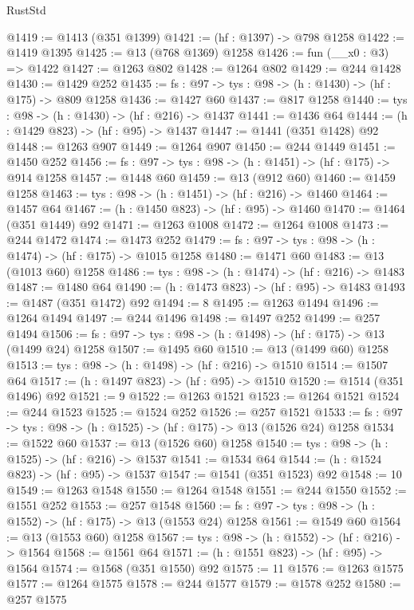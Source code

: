 \begin{lexlean}{RustStd}
\begin{coremodule}
@1419 := @1413 (@351 @1399)
@1421 := (hf : @1397) -> @798 @1258
@1422 := @1419 @1395
@1425 := @13 (@768 @1369) @1258
@1426 := fun (__x0 : @3) => @1422
@1427 := @1263 @802
@1428 := @1264 @802
@1429 := @244 @1428
@1430 := @1429 @252
@1435 := {fs : @97} -> {tys : @98} -> (h : @1430) -> (hf : @175) -> @809 @1258
@1436 := @1427 @60
@1437 := @817 @1258
@1440 := {tys : @98} -> (h : @1430) -> (hf : @216) -> @1437
@1441 := @1436 @64
@1444 := (h : @1429 @823) -> (hf : @95) -> @1437
@1447 := @1441 (@351 @1428) @92
@1448 := @1263 @907
@1449 := @1264 @907
@1450 := @244 @1449
@1451 := @1450 @252
@1456 := {fs : @97} -> {tys : @98} -> (h : @1451) -> (hf : @175) -> @914 @1258
@1457 := @1448 @60
@1459 := @13 (@912 @60)
@1460 := @1459 @1258
@1463 := {tys : @98} -> (h : @1451) -> (hf : @216) -> @1460
@1464 := @1457 @64
@1467 := (h : @1450 @823) -> (hf : @95) -> @1460
@1470 := @1464 (@351 @1449) @92
@1471 := @1263 @1008
@1472 := @1264 @1008
@1473 := @244 @1472
@1474 := @1473 @252
@1479 := {fs : @97} -> {tys : @98} -> (h : @1474) -> (hf : @175) -> @1015 @1258
@1480 := @1471 @60
@1483 := @13 (@1013 @60) @1258
@1486 := {tys : @98} -> (h : @1474) -> (hf : @216) -> @1483
@1487 := @1480 @64
@1490 := (h : @1473 @823) -> (hf : @95) -> @1483
@1493 := @1487 (@351 @1472) @92
@1494 := 8
@1495 := @1263 @1494
@1496 := @1264 @1494
@1497 := @244 @1496
@1498 := @1497 @252
@1499 := @257 @1494
@1506 := {fs : @97} -> {tys : @98} -> (h : @1498) -> (hf : @175) -> @13 (@1499 @24) @1258
@1507 := @1495 @60
@1510 := @13 (@1499 @60) @1258
@1513 := {tys : @98} -> (h : @1498) -> (hf : @216) -> @1510
@1514 := @1507 @64
@1517 := (h : @1497 @823) -> (hf : @95) -> @1510
@1520 := @1514 (@351 @1496) @92
@1521 := 9
@1522 := @1263 @1521
@1523 := @1264 @1521
@1524 := @244 @1523
@1525 := @1524 @252
@1526 := @257 @1521
@1533 := {fs : @97} -> {tys : @98} -> (h : @1525) -> (hf : @175) -> @13 (@1526 @24) @1258
@1534 := @1522 @60
@1537 := @13 (@1526 @60) @1258
@1540 := {tys : @98} -> (h : @1525) -> (hf : @216) -> @1537
@1541 := @1534 @64
@1544 := (h : @1524 @823) -> (hf : @95) -> @1537
@1547 := @1541 (@351 @1523) @92
@1548 := 10
@1549 := @1263 @1548
@1550 := @1264 @1548
@1551 := @244 @1550
@1552 := @1551 @252
@1553 := @257 @1548
@1560 := {fs : @97} -> {tys : @98} -> (h : @1552) -> (hf : @175) -> @13 (@1553 @24) @1258
@1561 := @1549 @60
@1564 := @13 (@1553 @60) @1258
@1567 := {tys : @98} -> (h : @1552) -> (hf : @216) -> @1564
@1568 := @1561 @64
@1571 := (h : @1551 @823) -> (hf : @95) -> @1564
@1574 := @1568 (@351 @1550) @92
@1575 := 11
@1576 := @1263 @1575
@1577 := @1264 @1575
@1578 := @244 @1577
@1579 := @1578 @252
@1580 := @257 @1575

\end{coremodule}
\end{lexlean}
